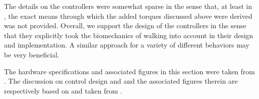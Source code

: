 \begin{refsection}
 The details on the controllers were somewhat sparse in the sense that, at least in \cite{mit_control_2006}, the exact means through which the added torques discussed above were derived was not provided.  Overall, we support the design of the controllers in the sense that they explicitly took the biomechanics of walking into account in their design and implementation.  A similar approach for a variety of different behaviors may be very beneficial.
 
The hardware specifications and associated figures in this section were taken from \cite{mit_design_2006}.  The discussion on control design and and the associated figures therein are respectively based on and taken from \cite{mit_control_2006}. 
 
 
 \printbibliography[heading=subbibliography]

\end{refsection}

 
% 



